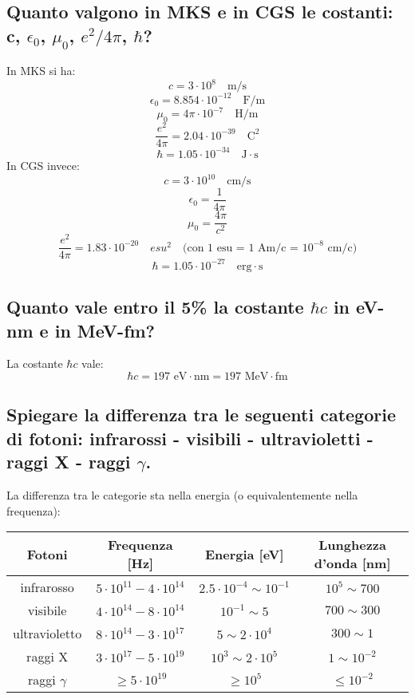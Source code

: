 \subsection[$\ $ Costanti c, $\epsilon_0$, $\mu_0$, $e^2 /4\pi$, $\hbar$ in CGS e MKSA]{Quanto valgono in MKS e in CGS le costanti: c, $\epsilon_0$,  $\mu_0$, $e^2/4\pi$,  $\hbar$?} 
In MKS si ha:
\[
	c = 3 \cdot 10^{8} \quad \text{m/s}
\] 
\[
	\epsilon_0 = 8.854 \cdot 10^{-12} \quad \text{F/m}
\]
\[
	\mu_0 = 4\pi \cdot 10^{-7} \quad \text{H/m}
\] 
\[
	\frac{e^{2}}{4\pi} = 2.04 \cdot 10^{-39} \quad \text{C}^{2}
\] 
\[
	\hbar = 1.05 \cdot 10^{-34} \quad \text{J} \cdot \text{s}
\] 
In CGS invece:
\[
	c = 3 \cdot 10^{10} \quad \text{cm/s}
\] 
\[
	\epsilon_0 = \frac{1}{4\pi}
\]
\[
	\mu_0 = \frac{4\pi}{c^{2}} 
\] 
\[
	\frac{e^{2}}{4\pi} = 1.83 \cdot 10^{-20} \quad esu^{2} \quad \text{(con 1 esu = 1 Am/c = $10^{-8}$ cm/c)} 
\] 
\[
	\hbar = 1.05 \cdot 10^{-27} \quad \text{erg} \cdot \text{s}
\]

\subsection[$\ $ Costante $\hbar \cdot c$ in eV$\cdot$nm e MeV$\cdot$fm]{Quanto vale entro il 5\% la costante $\hbar c$ in eV-nm e in MeV-fm?}
La costante $\hbar c$ vale:
\[
\hbar c = 197 \text{ eV}\cdot \text{nm} = 197 \text{ MeV}\cdot\text{fm}
\]  

\subsection[$\ $ Tipi di fotoni]{Spiegare la differenza tra le seguenti categorie di fotoni: infrarossi - visibili - ultravioletti - raggi X - raggi $\gamma$. } 
La differenza tra le categorie sta nella energia (o equivalentemente nella frequenza):
\begin{table}[H]
	\centering
	\label{tab: fotoni}
	\begin{tabular}{cccc}
		Fotoni & Frequenza [Hz] & Energia [eV] & Lunghezza d'onda [nm] \\
		\hline
		infrarosso 	&  $5 \cdot 10^{11} - 4 \cdot 10^{14}$ 	& $2.5\cdot10^{-4}\sim 10^{-1}$		&  $ 10^{5} \sim 700$  \\
		visibile 	&  $4 \cdot 10^{14} - 8 \cdot 10^{14}$ 	&    $10^{-1} \sim 5$ 			&  $700 \sim 300$ \\
		ultravioletto 	&  $8 \cdot 10^{14} - 3 \cdot 10^{17}$ 	&      $5 \sim 2\cdot 10^4$		& $300 \sim 1 $  \\
		raggi X 	&  $3 \cdot 10^{17} - 5 \cdot 10^{19}$ 	& $ 10^3 \sim 2 \cdot 10^{5} $ 		&  $1 \sim 10^{-2}$  \\
		raggi $\gamma$ 	&   $\ge 5 \cdot 10^{19}$ 		&       $\ge 10^5$			& $\le 10^{-2}$
	\end{tabular}
\end{table}

